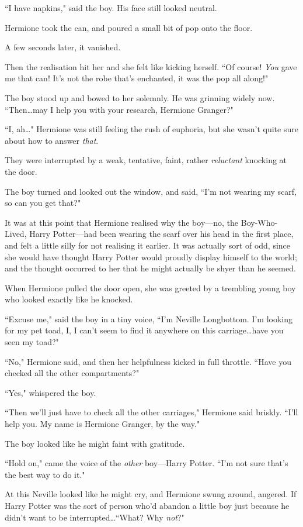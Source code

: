 ``I have napkins," said the boy. His face still looked neutral.

Hermione took the can, and poured a small bit of pop onto the floor.

A few seconds later, it vanished.

Then the realisation hit her and she felt like kicking herself. ``Of course! \emph{You} gave me that can! It's not the robe that's enchanted, it was the pop all along!"

The boy stood up and bowed to her solemnly. He was grinning widely now. ``Then…may I help you with your research, Hermione Granger?"

``I, ah…" Hermione was still feeling the rush of euphoria, but she wasn't quite sure about how to answer \emph{that}.

They were interrupted by a weak, tentative, faint, rather \emph{reluctant} knocking at the door.

The boy turned and looked out the window, and said, ``I'm not wearing my scarf, so can you get that?"

It was at this point that Hermione realised why the boy—no, the Boy-Who-Lived, Harry Potter—had been wearing the scarf over his head in the first place, and felt a little silly for not realising it earlier. It was actually sort of odd, since she would have thought Harry Potter would proudly display himself to the world; and the thought occurred to her that he might actually be shyer than he seemed.

When Hermione pulled the door open, she was greeted by a trembling young boy who looked exactly like he knocked.

``Excuse me," said the boy in a tiny voice, ``I'm Neville Longbottom. I'm looking for my pet toad, I, I can't seem to find it anywhere on this carriage…have you seen my toad?"

``No," Hermione said, and then her helpfulness kicked in full throttle. ``Have you checked all the other compartments?"

``Yes," whispered the boy.

``Then we'll just have to check all the other carriages," Hermione said briskly. ``I'll help you. My name is Hermione Granger, by the way."

The boy looked like he might faint with gratitude.

``Hold on," came the voice of the \emph{other} boy—Harry Potter. ``I'm not sure that's the best way to do it."

At this Neville looked like he might cry, and Hermione swung around, angered. If Harry Potter was the sort of person who'd abandon a little boy just because he didn't want to be interrupted…``What? Why \emph{not}?"

